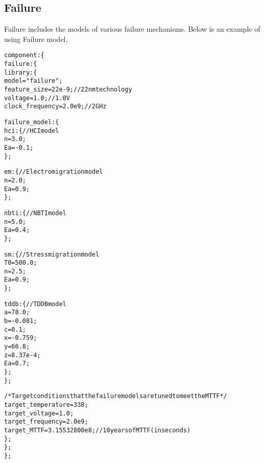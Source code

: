 \pagebreak
\subsection{Failure}
\noindent
Failure includes the models of various failure mechanisms. Below is an example of using Failure model.
{
\fontsize{10pt}{11pt}\selectfont
\begin{alltt}
component: \{
    failure: \{
        library: \{
            model = "failure";
            feature_size = 22e-9; // 22nm technology
            voltage = 1.0; // 1.0V
            clock_frequency = 2.0e9; // 2GHz
            
            failure_model: \{
                hci: \{ // HCI model
                    n = 3.0;
                    Ea = -0.1;
                \};
                
                em: \{ // Electromigration model
                    n = 2.0;
                    Ea = 0.9;
                \};
                
                nbti: \{ // NBTI model
                    n = 5.0;
                    Ea = 0.4;
                \};
                
                sm: \{ // Stress migration model
                    T0 = 500.0;
                    n = 2.5;
                    Ea = 0.9;
                \};
                
                tddb: \{ // TDDB model
                    a = 78.0;
                    b = -0.081;
                    c = 0.1;
                    x = -0.759;
                    y = 66.8;
                    z = 8.37e-4;
                    Ea = 0.7;
                \};
            \};
            
            /* Target conditions that the failure models are tuned to meet the MTTF */
            target_temperature = 338;
            target_voltage = 1.0;
            target_frequency = 2.0e9;
            target_MTTF = 3.15532800e8; // 10 years of MTTF (in seconds)
        \};
    \};
\};
\end{alltt}
}

\pagebreak
